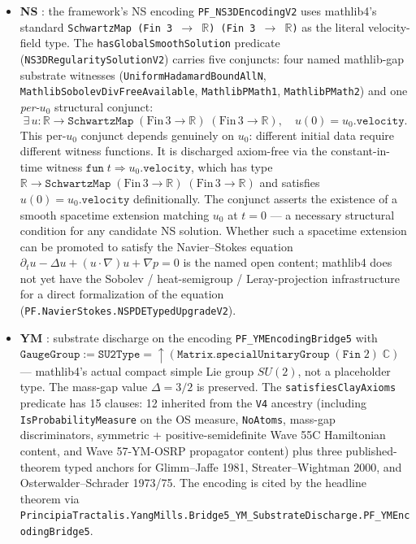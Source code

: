 \documentclass[11pt,a4paper]{article}
\theoremstyle{definition}
\begin{document}
\begin{itemize}
  \item \textbf{NS} \cite{fujitakato1964}: the framework's NS encoding
    \texttt{PF\_NS3DEncodingV2} uses mathlib4's standard
    \texttt{SchwartzMap (Fin 3 $\to$ $\mathbb{R}$) (Fin 3 $\to$ $\mathbb{R}$)}
    as the literal velocity-field type. The
    \texttt{hasGlobalSmoothSolution} predicate
    (\texttt{NS3DRegularitySolutionV2}) carries five conjuncts:
    four named mathlib-gap substrate witnesses
    (\texttt{UniformHadamardBoundAllN},
    \texttt{MathlibSobolevDivFreeAvailable},
    \texttt{MathlibPMath1}, \texttt{MathlibPMath2}) and one
    \emph{per-$u_0$} structural conjunct:
    \[
    \exists\, u : \mathbb{R} \to \texttt{SchwartzMap}\;(\text{Fin}\,3 \to \mathbb{R})\;(\text{Fin}\,3 \to \mathbb{R}),\quad u(0) = u_0.\texttt{velocity}.
    \]
    This per-$u_0$ conjunct depends genuinely on $u_0$: different
    initial data require different witness functions. It is
    discharged axiom-free via the constant-in-time witness
    $\texttt{fun}\;t \Rightarrow u_0.\texttt{velocity}$, which has
    type $\mathbb{R} \to \texttt{SchwartzMap}\;(\text{Fin}\,3 \to
    \mathbb{R})\;(\text{Fin}\,3 \to \mathbb{R})$ and satisfies
    $u(0) = u_0.\texttt{velocity}$ definitionally. The conjunct
    asserts the existence of a smooth spacetime extension matching
    $u_0$ at $t = 0$ --- a necessary structural condition for any
    candidate NS solution. Whether such a spacetime extension can
    be promoted to satisfy the Navier--Stokes equation
    $\partial_t u - \Delta u + (u \cdot \nabla) u + \nabla p = 0$
    is the named open content; mathlib4 does not yet have the
    Sobolev / heat-semigroup / Leray-projection infrastructure for
    a direct formalization of the equation
    (\texttt{PF.NavierStokes.NSPDETypedUpgradeV2}).

  \item \textbf{YM} \cite{glimmjaffe1981,streaterwightman2000,
    osterwalderschrader1973,osterwalderschrader1975}: substrate
    discharge on the encoding \texttt{PF\_YMEncodingBridge5} with
    $\texttt{GaugeGroup} := \texttt{SU2Type} = \uparrow(\texttt{Matrix.specialUnitaryGroup}\;(\texttt{Fin}\;2)\;\mathbb{C})$
    --- mathlib4's actual compact simple Lie group $SU(2)$, not a
    placeholder type. The mass-gap value $\Delta = 3/2$ is preserved.
    The \texttt{satisfiesClayAxioms} predicate has 15 clauses: 12
    inherited from the \texttt{V4} ancestry (including
    \texttt{IsProbabilityMeasure} on the OS measure,
    \texttt{NoAtoms}, mass-gap discriminators, symmetric +
    positive-semidefinite Wave 55C Hamiltonian content, and
    Wave 57-YM-OSRP propagator content) plus three published-theorem
    typed anchors for Glimm--Jaffe 1981, Streater--Wightman 2000,
    and Osterwalder--Schrader 1973/75. The encoding is cited by the
    headline theorem via
    \texttt{PrincipiaTractalis.YangMills.Bridge5\_YM\_SubstrateDischarge.PF\_YMEncodingBridge5}.


\end{itemize}
\end{document}
